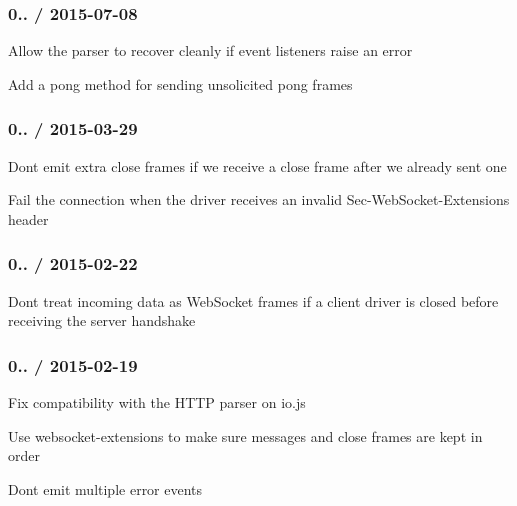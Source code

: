 \subsubsection*{0.. / 2015-\/07-\/08}


\begin{DoxyItemize}
\item Allow the parser to recover cleanly if event listeners raise an error
\item Add a {\ttfamily pong} method for sending unsolicited pong frames
\end{DoxyItemize}

\subsubsection*{0.. / 2015-\/03-\/29}


\begin{DoxyItemize}
\item Don\textquotesingle{}t emit extra close frames if we receive a close frame after we already sent one
\item Fail the connection when the driver receives an invalid {\ttfamily Sec-\/\+Web\+Socket-\/\+Extensions} header
\end{DoxyItemize}

\subsubsection*{0.. / 2015-\/02-\/22}


\begin{DoxyItemize}
\item Don\textquotesingle{}t treat incoming data as Web\+Socket frames if a client driver is closed before receiving the server handshake
\end{DoxyItemize}

\subsubsection*{0.. / 2015-\/02-\/19}


\begin{DoxyItemize}
\item Fix compatibility with the H\+T\+TP parser on io.\+js
\item Use {\ttfamily websocket-\/extensions} to make sure messages and close frames are kept in order
\item Don\textquotesingle{}t emit multiple {\ttfamily error} events
\end{DoxyItemize}

